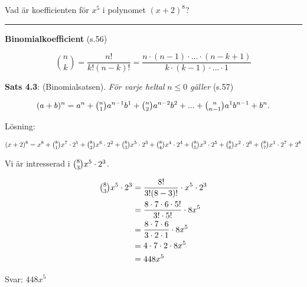 \documentclass[11pt]{article}
\begin{document}
Vad är koefficienten för $x^5$ i polynomet $(x + 2)^8$?

\noindent\rule{\textwidth}{0.5pt}

\textbf{Binomialkoefficient} (s.56)

\[
    \binom{n}{k} = \frac{n!}{k!(n - k)!} = \frac{n \cdot (n - 1) \cdot ... \cdot (n - k + 1)}{k \cdot (k - 1) \cdot ... \cdot 1}
\]

\textbf{Sats 4.3}: (Binomialsatsen). \textit{För varje heltal} $n \leq 0$ \textit{gäller} (s.57)

\[
    (a + b)^n = a^n + \tbinom{n}{1}a^{n - 1}b^1 + \tbinom{n}{2}a^{n - 2}b^2 + ... + \tbinom{n}{n - 1}a^1 b^{n - 1} + b^n.
\]

Lösning:

\[
    (x + 2)^8 = x^8 + \tbinom{8}{1}x^7 \cdot 2^1 + \tbinom{8}{2}x^6 \cdot 2^2 + \tbinom{8}{3}x^5 \cdot 2^3 + \tbinom{8}{4}x^4 \cdot 2^4 + \tbinom{8}{5}x^3 \cdot 2^5 + \tbinom{8}{6}x^2 \cdot 2^6 + \tbinom{8}{7}x^1 \cdot 2^7 + 2^8
\]

Vi är intresserad i $\tbinom{8}{3}x^5 \cdot 2^3$.

\begin{align*}
    \tbinom{8}{3}x^5 \cdot 2^3 &= \frac{8!}{3!(8 - 3)!} \cdot x^5 \cdot 2^3\\
    &= \frac{8 \cdot 7 \cdot 6 \cdot 5!}{3! \cdot 5!} \cdot 8x^5\\
    &= \frac{8 \cdot 7 \cdot 6 }{3 \cdot 2 \cdot 1} \cdot 8x^5\\
    &= 4 \cdot 7 \cdot 2 \cdot 8x^5\\
    &= 448x^5
\end{align*}

Svar: $448x^5$
\end{document}

